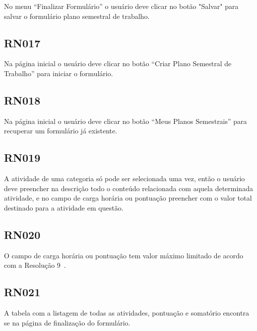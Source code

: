 No menu ``Finalizar Formulário'' o usuário deve clicar no botão "Salvar" para salvar o formulário plano semestral de trabalho.

\subsection{RN017}\label{rn017}

Na página inicial o usuário deve clicar no botão ``Criar Plano Semestral de Trabalho'' para iniciar o formulário.

\subsection{RN018}\label{rn018}

Na página inicial o usuário deve clicar no botão ``Meus Planos Semestrais'' para recuperar um formulário já existente.

\subsection{RN019}\label{rn019}

A atividade de uma categoria só pode ser selecionada uma vez, então o usuário deve preencher  na descrição todo o conteúdo relacionada com aquela determinada atividade, e no campo de carga horária ou pontuação preencher com o valor total destinado para a atividade em questão.

\subsection{RN020}\label{rn020}

O campo de carga horária ou pontuação tem valor máximo limitado de acordo com a Resolução 9~\citep{resolucao}.

\subsection{RN021}\label{rn021}

A tabela com a listagem de todas as atividades, pontuação e somatório encontra se na página de finalização do formulário.

